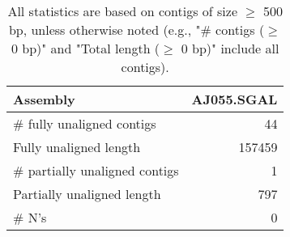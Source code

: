 \documentclass[12pt,a4paper]{article}
\begin{document}
\begin{table}[ht]
\begin{center}
\caption{All statistics are based on contigs of size $\geq$ 500 bp, unless otherwise noted (e.g., "\# contigs ($\geq$ 0 bp)" and "Total length ($\geq$ 0 bp)" include all contigs).}
\begin{tabular}{|l*{1}{|r}|}
\hline
Assembly & AJ055.SGAL \\ \hline
\# fully unaligned contigs & 44 \\ \hline
Fully unaligned length & 157459 \\ \hline
\# partially unaligned contigs & 1 \\ \hline
Partially unaligned length & 797 \\ \hline
\# N's & 0 \\ \hline
\end{tabular}
\end{center}
\end{table}
\end{document}
